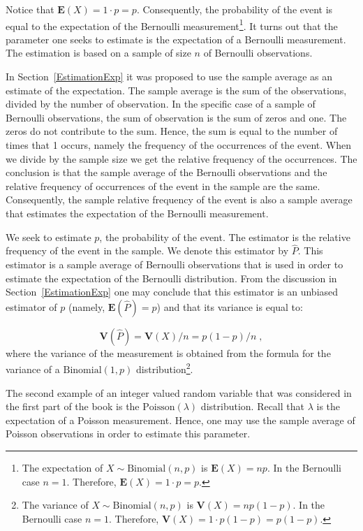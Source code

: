 \documentclass[
]{krantz}
\newcommand{\Expec}{\mathbf{E}}
\newcommand{\Var}{\mathbf{V}}
\theoremstyle{definition}
\theoremstyle{definition}
\theoremstyle{definition}
\theoremstyle{remark}
\begin{document}
Notice that \(\Expec(X) = 1 \cdot p = p\). Consequently, the probability
of the event is equal to the expectation of the Bernoulli
measurement\footnote{The expectation of \(X\sim\mathrm{Binomial}(n,p)\) is
  \(\Expec(X)=np\). In the Bernoulli case \(n=1\). Therefore,
  \(\Expec(X) = 1\cdot p = p\).}. It turns out that the parameter one seeks to estimate
is the expectation of a Bernoulli measurement. The estimation is based
on a sample of size \(n\) of Bernoulli observations.

In Section~\ref{EstimationExp} it was proposed to use the sample
average as an estimate of the expectation. The sample average is the sum
of the observations, divided by the number of observation. In the
specific case of a sample of Bernoulli observations, the sum of
observation is the sum of zeros and one. The zeros do not contribute to
the sum. Hence, the sum is equal to the number of times that 1 occurs,
namely the frequency of the occurrences of the event. When we divide by
the sample size we get the relative frequency of the occurrences. The
conclusion is that the sample average of the Bernoulli observations and
the relative frequency of occurrences of the event in the sample are the
same. Consequently, the sample relative frequency of the event is also a
sample average that estimates the expectation of the Bernoulli
measurement.

We seek to estimate \(p\), the probability of the event. The estimator is
the relative frequency of the event in the sample. We denote this
estimator by \(\hat P\). This estimator is a sample average of Bernoulli
observations that is used in order to estimate the expectation of the
Bernoulli distribution. From the discussion in
Section~\ref{EstimationExp} one may conclude that this estimator is an
unbiased estimator of \(p\) (namely, \(\Expec(\hat P) = p\)) and that its
variance is equal to:

\[\Var(\hat P) = \Var(X) / n = p(1-p)/n\;,\] where
the variance of the measurement is obtained from the formula for the
variance of a \(\mathrm{Binomial}(1,p)\) distribution\footnote{The variance of \(X\sim\mathrm{Binomial}(n,p)\) is
  \(\Var(X)=np(1-p)\). In the Bernoulli case \(n=1\). Therefore,
  \(\Var(X) = 1\cdot p(1-p) = p(1-p)\).}.

The second example of an integer valued random variable that was
considered in the first part of the book is the
\(\mathrm{Poisson}(\lambda)\) distribution. Recall that \(\lambda\) is the
expectation of a Poisson measurement. Hence, one may use the sample
average of Poisson observations in order to estimate this parameter.
\end{document}
